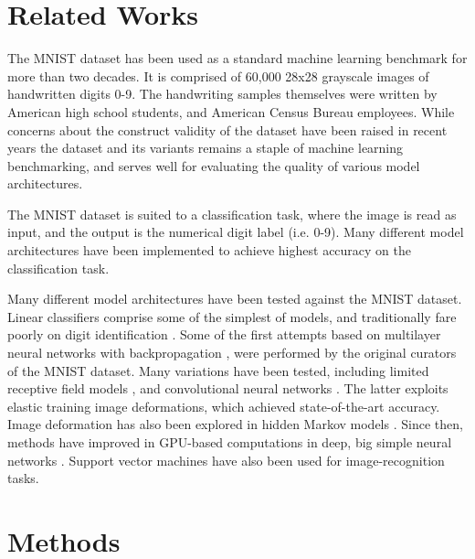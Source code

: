 \documentclass{article}
\begin{document}
\section{Related Works}

The MNIST dataset \citep{bottouComparisonClassifierMethods1994, HandwrittenDigitDatabase}
has been used as a standard machine learning benchmark
for more than two decades.
It is comprised of 60,000 28x28 grayscale images of handwritten digits 0-9.
The handwriting samples themselves were written by American high school students,
and American Census Bureau employees.
While concerns about the construct validity of the dataset have been raised in recent years \citep{yadavColdCaseLost2019}
the dataset and its variants remains a staple of machine learning benchmarking,
and serves well for evaluating the quality of various model architectures.

The MNIST dataset is suited to a classification task,
where the image is read as input, and the output is the numerical digit label (i.e. 0-9).
Many different model architectures have been implemented to achieve highest accuracy on the classification task.

Many different model architectures have been tested against the MNIST dataset.
Linear classifiers comprise some of the simplest of models, and traditionally fare poorly on digit identification
\citep{bottouComparisonClassifierMethods1994}.
Some of the first attempts based on multilayer neural networks with backpropagation \citep{bottouComparisonClassifierMethods1994, lecunGradientbasedLearningApplied1998},
were performed by the original curators of the MNIST dataset.
Many variations have been tested, including limited receptive field models \citep{kussulImprovedMethodHandwritten2004},
and convolutional neural networks \citep{simardBestPracticesConvolutional2003}.
The latter exploits elastic training image deformations, which achieved state-of-the-art accuracy.
Image deformation has also been explored in hidden Markov models \citep{keysersDeformationModelsImage2007}.
Since then, methods have improved in GPU-based computations in deep, big simple neural networks
\citep{ciresanDeepBigSimple2010, ciresanMulticolumnDeepNeural2012}.
Support vector machines \citep{decosteTrainingInvariantSupport2002} have also been used for image-recognition tasks.

\section{Methods}
\end{document}

